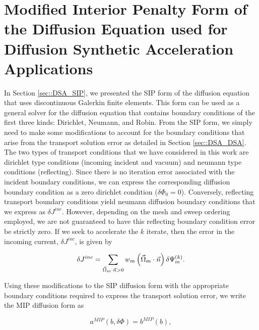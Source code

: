 \section{Modified Interior Penalty Form of the Diffusion Equation used for Diffusion Synthetic Acceleration Applications}
\label{sec::DSA_MIP}

In Section \ref{sec::DSA_SIP}, we presented the SIP form of the diffusion equation that uses discontinuous Galerkin finite elements. This form can be used as a general solver for the diffusion equation that contains boundary conditions of the first three kinds: Dirichlet, Neumann, and Robin. From the SIP form, we simply need to make some modifications to account for the boundary conditions that arise from the transport solution error as detailed in Section \ref{sec::DSA_DSA}. The two types of transport conditions that we have considered in this work are dirichlet type conditions (incoming incident and vacuum) and neumann type conditions (reflecting). Since there is no iteration error associated with the incident boundary conditions, we can express the corresponding diffusion boundary condition as a zero dirichlet condition ($\delta \Phi_0 = 0$). Conversely, reflecting transport boundary conditions yield neumann diffusion boundary conditions that we express as $\delta J^{inc}$. However, depending on the mesh and sweep ordering employed, we are not guaranteed to have this reflecting boundary condition error be strictly zero. If we seek to accelerate the $k$ iterate, then the error in the incoming current, $\delta J^{inc}$, is given by

\begin{equation}
\label{eq::MIP_inc_curr_error}
\delta J^{inc} = \sum\displaylimits_{\vec{\Omega}_m \cdot \vec{n} > 0} w_m \left(\vec{\Omega}_m \cdot \vec{n} \right) \delta \Psi_m^{(k)}.
\end{equation}

 \noindent Using these modifications to the SIP diffusion form with the appropriate boundary conditions required to express the transport solution error, we write the MIP diffusion form as

\begin{equation}
a^{MIP}( b, \delta \Phi) = b^{MIP}(b),
\label{eq::MIP_weak_form}
\end{equation}

